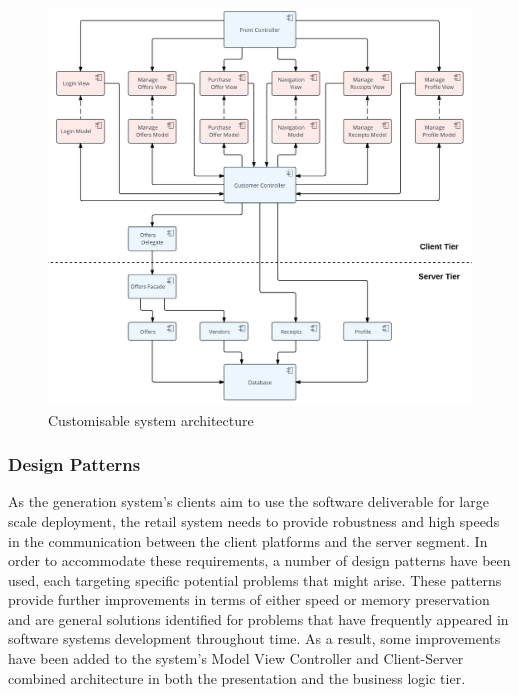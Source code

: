 \begin{figure}[!ht]
\centering
\includegraphics[scale=0.22]{img/System_Architecture.png}
\caption{Customisable system architecture}
\label{fig:system_architecture}
\end{figure}

\subsubsection{Design Patterns}

As the generation system's clients aim to use the software deliverable for large scale deployment, the retail system needs to provide robustness and high speeds in the communication between the client platforms and the server segment. In order to accommodate these requirements, a number of design patterns have been used, each targeting specific potential problems that might arise. These patterns provide further improvements in terms of either speed or memory preservation and are general solutions identified for problems that have frequently appeared in software systems development throughout time. As a result, some improvements have been added to the system's Model View Controller and Client-Server combined architecture in both the presentation and the business logic tier.\\

